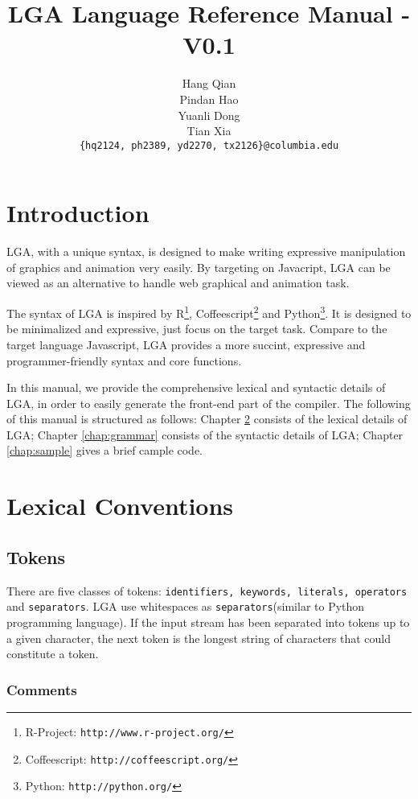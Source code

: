 \documentclass[10pt]{report}
\title{\textbf{LGA Language Reference Manual - V0.1}}
\author{ Hang Qian \\ Pindan Hao \\ Yuanli Dong \\ Tian Xia \\ {\small \texttt{\{hq2124, ph2389, yd2270, tx2126\}@columbia.edu}}}
\date{}
\begin{document}
\maketitle
\tableofcontents

\newpage

\chapter{Introduction}
\label{chap:intro}

LGA, with a unique syntax, is designed to make writing expressive manipulation of graphics and animation very easily. By targeting on Javacript, LGA can be viewed as an alternative to handle web graphical and animation task. 

The syntax of LGA is inspired by R\footnote{R-Project: \texttt{http://www.r-project.org/}}, Coffeescript\footnote{Coffeescript: \texttt{http://coffeescript.org/}} and Python\footnote{Python: \texttt{http://python.org/}}. It is designed to be minimalized and expressive, just focus on the target task. Compare to the target language Javascript, LGA provides a more succint, expressive and programmer-friendly syntax and core functions.

In this manual, we provide the comprehensive lexical and syntactic details of LGA, in order to easily generate the front-end part of the compiler. The following of this manual is structured as follows: Chapter \ref{chap:lex} consists of the lexical details of LGA; Chapter \ref{chap:grammar} consists of the syntactic details of LGA; Chapter \ref{chap:sample} gives a brief cample code.

\chapter{Lexical Conventions}
\label{chap:lex}


\section{Tokens}
\label{sec:token}

There are five classes of tokens: \texttt{identifiers, keywords, literals, operators} and \texttt{separators}. LGA use whitespaces as \texttt{separators}(similar to Python programming language). If the input stream has been separated into tokens up to a given character, the next token is the longest string of characters that could constitute a token.

\subsection{Comments}
\label{sec:comments}
\end{document}
